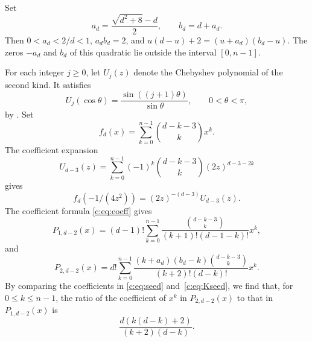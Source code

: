 \documentclass[11pt]{article}
\numberwithin{equation}{section}
\theoremstyle{remark}\newtheorem{remark}[theorem]{Remark}
\begin{document}
Set
\begin{equation*}
 a_d=\frac{\sqrt{d^2+8}-d}{2},\qquad b_d=d+a_d.
\end{equation*}
Then $0<a_d<2/d<1$, $a_d b_d=2$, and $u(d-u)+2=(u+a_d)(b_d-u)$.
The zeros $-a_d$ and $b_d$ of this quadratic lie outside the interval
$[0,n-1]$.

For each integer $j\ge0$, let $U_j(z)$ denote the Chebyshev polynomial
of the second kind. It satisfies
\[
 U_j(\cos\theta)=\frac{\sin((j+1)\theta)}{\sin\theta},
 \qquad 0<\theta<\pi,
\]
by \cite[Eq.~(18.5.2)]{DLMF}. Set
\[
 f_d(x)=\sum_{k=0}^{n-1}\binom{d-k-3}{k}x^k.
\]
The coefficient expansion
\[
 U_{d-3}(z)=\sum_{k=0}^{n-1}(-1)^k
 \binom{d-k-3}{k}(2z)^{d-3-2k}
\]
gives
\begin{equation}\label{c:eq:Cheb}
 f_d(-1/(4z^2))=(2z)^{-(d-3)}U_{d-3}(z).
\end{equation}
The coefficient formula \eqref{c:eq:coeff} gives
\begin{equation}
 P_{1,d-2}(x)=(d-1)!\sum_{k=0}^{n-1}
 \frac{\binom{d-k-3}{k}}{(k+1)!(d-1-k)!}x^k,\label{c:eq:seed}
\end{equation}
and
\begin{equation}
 P_{2,d-2}(x)=d!\sum_{k=0}^{n-1}
 \frac{(k+a_d)(b_d-k)\binom{d-k-3}{k}}{(k+2)!(d-k)!}x^k.
 \label{c:eq:Kseed}
\end{equation}
By comparing the coefficients in \eqref{c:eq:seed} and~\eqref{c:eq:Kseed},
we find that, for $0\le k\le n-1$, the ratio of the coefficient of $x^k$ in
$P_{2,d-2}(x)$ to that in $P_{1,d-2}(x)$ is
\begin{equation}\label{c:eq:Kcoeff}
 \frac{d(k(d-k)+2)}{(k+2)(d-k)}.
\end{equation}
\end{document}

